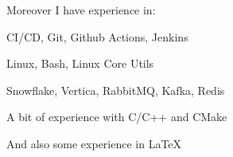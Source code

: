 Moreover I have experience in:
\begin{bulist}
\item CI/CD, Git, Github Actions, Jenkins
\item Linux, Bash, Linux Core Utils
\item Snowflake, Vertica, RabbitMQ, Kafka, Redis
\item A bit of experience with C/C++ and CMake
\end{bulist}
And also some experience in \LaTeX

